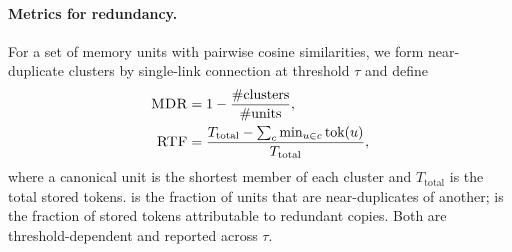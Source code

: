 \paragraph{Metrics for redundancy.} For a set of memory units with pairwise
cosine similarities, we form near-duplicate clusters by single-link connection
at threshold $\tau$ and define
\begin{align}
\textsc{MDR} &= 1 - \frac{\#\text{clusters}}{\#\text{units}}, \\
\textsc{RTF} &= \frac{T_\text{total} - \sum_{c}\min_{u\in c} \text{tok}(u)}{T_\text{total}},
\end{align}
where a canonical unit is the shortest member of each cluster and
$T_\text{total}$ is the total stored tokens. \mdr{} is the fraction of units
that are near-duplicates of another; \rtf{} is the fraction of stored tokens
attributable to redundant copies. Both are threshold-dependent and reported
across $\tau$.
